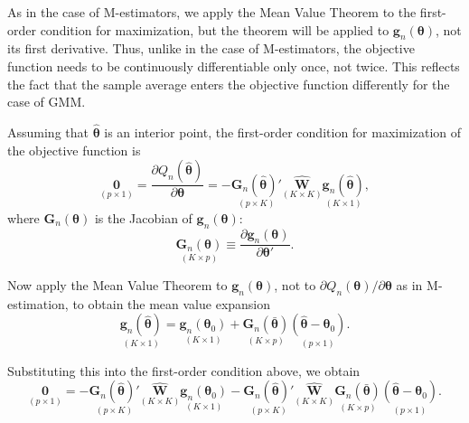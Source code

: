 As in the case of M-estimators, we apply the Mean Value Theorem to the first-order condition for maximization, but the theorem will be applied to $\mathbf{g}_n(\bm{\theta})$, not its first derivative. Thus, unlike in the case of M-estimators, the objective function needs to be continuously differentiable only once, not twice. This reflects the fact that the sample average enters the objective function differently for the case of GMM.

Assuming that $\hat{\bm{\theta}}$ is an interior point, the first-order condition for maximization of the objective function is
\begin{equation}
\label{eq:7.3.28}
\underset{(p \times 1)}{\mathbf{0}} = \frac{\partial Q_n(\hat{\bm{\theta}})}{\partial \bm{\theta}} = -\underset{(p \times K)}{\mathbf{G}_n(\hat{\bm{\theta}})'} \underset{(K \times K)}{\widehat{\mathbf{W}}} \underset{(K \times 1)}{\mathbf{g}_n(\hat{\bm{\theta}})},
\end{equation}
where $\mathbf{G}_n(\bm{\theta})$ is the Jacobian of $\mathbf{g}_n(\bm{\theta})$:
\begin{equation}
\label{eq:7.3.29}
\underset{(K \times p)}{\mathbf{G}_n(\bm{\theta})} \equiv \frac{\partial \mathbf{g}_n(\bm{\theta})}{\partial \bm{\theta}'}.
\end{equation}

Now apply the Mean Value Theorem to $\mathbf{g}_n(\bm{\theta})$, not to $\partial Q_n(\bm{\theta})/\partial\bm{\theta}$ as in M-estimation, to obtain the mean value expansion
\begin{equation}
\label{eq:7.3.30}
\underset{(K \times 1)}{\mathbf{g}_n(\hat{\bm{\theta}})} = \underset{(K \times 1)}{\mathbf{g}_n(\bm{\theta}_0)} + \underset{(K \times p)}{\mathbf{G}_n(\bar{\bm{\theta}})} \underset{(p \times 1)}{(\hat{\bm{\theta}} - \bm{\theta}_0)}.
\end{equation}

Substituting this into the first-order condition above, we obtain
\begin{equation}
\label{eq:7.3.31}
\underset{(p \times 1)}{\mathbf{0}} = -\underset{(p \times K)}{\mathbf{G}_n(\hat{\bm{\theta}})'} \underset{(K \times K)}{\widehat{\mathbf{W}}} \underset{(K \times 1)}{\mathbf{g}_n(\bm{\theta}_0)} - \underset{(p \times K)}{\mathbf{G}_n(\hat{\bm{\theta}})'} \underset{(K \times K)}{\widehat{\mathbf{W}}} \underset{(K \times p)}{\mathbf{G}_n(\bar{\bm{\theta}})} \underset{(p \times 1)}{(\hat{\bm{\theta}} - \bm{\theta}_0)}.
\end{equation}

